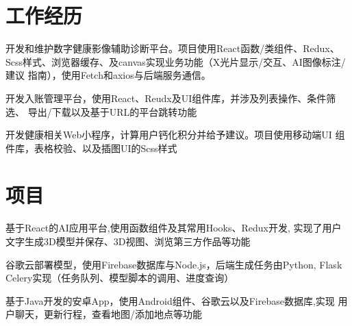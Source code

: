 \documentclass[]{deedy-resume-openfont}
\begin{document}
\begin{minipage}[t]{0.73\textwidth} 


\section{工作经历}
\sectionsep
{}
\vspace{\topsep}
\begin{tightemize}
    \item 开发和维护数字健康影像辅助诊断平台。项目使用React函数/类组件、Redux、
    Scss样式、浏览器缓存、及canvas实现业务功能（X光片显示/交互、AI图像标注/建议
    指南），使用Fetch和axios与后端服务通信。
    \item 开发入账管理平台，使用React、Reudx及UI组件库，并涉及列表操作、条件筛选、
    导出/下载以及基于URL的平台跳转功能
    \item 开发健康相关Web小程序，计算用户钙化积分并给予建议。项目使用移动端UI
    组件库，表格校验、以及插图UI的Scss样式
    
\end{tightemize}
\sectionsep


\section{项目}
\sectionsep
{}
\begin{tightemize}
    \item 基于React的AI应用平台,使用函数组件及其常用Hooks、Redux开发, 实现了用户文字生成3D模型并保存、3D视图、浏览第三方作品等功能
    \item 谷歌云部署模型，使用Firebase数据库与Node.js，后端生成任务由Python, Flask Celery实现（任务队列、模型脚本的调用、进度查询）

    \end{tightemize}

\sectionsep

\begin{tightemize}
    \item 基于Java开发的安卓App，使用Android组件、谷歌云以及Firebase数据库,实现
    用户聊天，更新行程，查看地图/添加地点等功能
    \end{tightemize}


\end{minipage}
\end{document}
